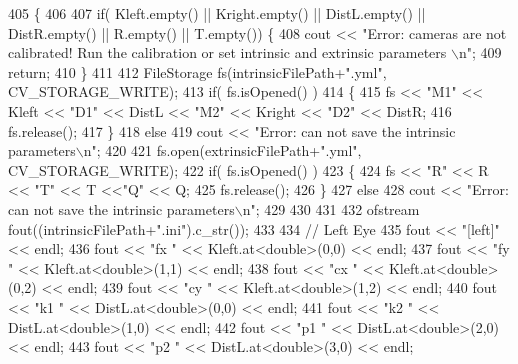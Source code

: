 \begin{DoxyCode}
405                                                                                      \{
406 
407     \textcolor{keywordflow}{if}( Kleft.empty() || Kright.empty() || DistL.empty() || DistR.empty() || R.empty() || T.empty()) \{
408             cout << \textcolor{stringliteral}{"Error: cameras are not calibrated! Run the calibration or set intrinsic and extrinsic
       parameters \(\backslash\)n"};
409             \textcolor{keywordflow}{return};
410     \}
411 
412     FileStorage fs(intrinsicFilePath+\textcolor{stringliteral}{".yml"}, CV\_STORAGE\_WRITE);
413     \textcolor{keywordflow}{if}( fs.isOpened() )
414     \{
415         fs << \textcolor{stringliteral}{"M1"} << Kleft << \textcolor{stringliteral}{"D1"} << DistL << \textcolor{stringliteral}{"M2"} << Kright << \textcolor{stringliteral}{"D2"} << DistR;
416         fs.release();
417     \}
418     \textcolor{keywordflow}{else}
419         cout << \textcolor{stringliteral}{"Error: can not save the intrinsic parameters\(\backslash\)n"};
420 
421     fs.open(extrinsicFilePath+\textcolor{stringliteral}{".yml"}, CV\_STORAGE\_WRITE);
422     \textcolor{keywordflow}{if}( fs.isOpened() )
423     \{
424         fs << \textcolor{stringliteral}{"R"} << R << \textcolor{stringliteral}{"T"} << T <<\textcolor{stringliteral}{"Q"} << Q;
425         fs.release();
426     \}
427     \textcolor{keywordflow}{else}
428         cout << \textcolor{stringliteral}{"Error: can not save the intrinsic parameters\(\backslash\)n"};
429 
430 
431 
432     ofstream fout((intrinsicFilePath+\textcolor{stringliteral}{".ini"}).c\_str());
433 
434     \textcolor{comment}{// Left Eye}
435     fout << \textcolor{stringliteral}{"[left]"} << endl;
436     fout << \textcolor{stringliteral}{"fx "} << Kleft.at<\textcolor{keywordtype}{double}>(0,0) << endl;
437     fout << \textcolor{stringliteral}{"fy "} << Kleft.at<\textcolor{keywordtype}{double}>(1,1) << endl;
438     fout << \textcolor{stringliteral}{"cx "} << Kleft.at<\textcolor{keywordtype}{double}>(0,2) << endl;
439     fout << \textcolor{stringliteral}{"cy "} << Kleft.at<\textcolor{keywordtype}{double}>(1,2) << endl;
440     fout << \textcolor{stringliteral}{"k1 "} << DistL.at<\textcolor{keywordtype}{double}>(0,0) << endl;
441     fout << \textcolor{stringliteral}{"k2 "} << DistL.at<\textcolor{keywordtype}{double}>(1,0) << endl;
442     fout << \textcolor{stringliteral}{"p1 "} << DistL.at<\textcolor{keywordtype}{double}>(2,0) << endl;
443     fout << \textcolor{stringliteral}{"p2 "} << DistL.at<\textcolor{keywordtype}{double}>(3,0) << endl;

\end{DoxyCode}
